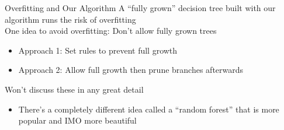 \documentclass[aspectratio=169]{../latex_main/tntbeamer}  %
\begin{document}
	\begin{frame}{Overfitting and Our Algorithm}
	    A “fully grown” decision tree built with our algorithm runs the risk of overfitting\\
	    \bigskip
	    One idea to avoid overfitting: Don’t allow fully grown trees
	    \begin{itemize}
	        \item Approach 1: Set rules to prevent full growth
	        \item Approach 2: Allow full growth then prune branches afterwards
	    \end{itemize}
	    
        Won’t discuss these in any great detail
        \begin{itemize}
            \item There’s a completely different idea called a “random forest” that is more popular and IMO more beautiful
        \end{itemize}
	\end{frame}
	
\end{document}
